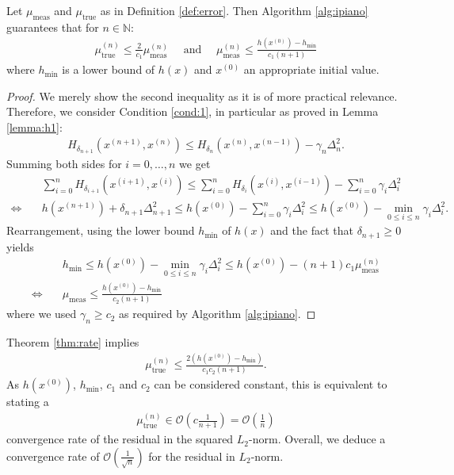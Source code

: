 \documentclass[onecolumn,final,a4paper,13pt,reqno]{siamart}
\begin{document}
\begin{theoremmd}
	Let $\mu_\text{meas}$ and $\mu_\text{true}$ as in Definition \ref{def:error}. Then Algorithm \ref{alg:ipiano} guarantees that for $n \in \mathbb{N}$:
	\begin{align}
		\mu_\text{true}^{(n)} \leq \frac{2}{c_1} \mu_\text{meas}^{(n)}\quad\text{ and }\quad \mu_\text{meas}^{(n)} \leq \frac{h(x^{(0)}) - h_{\min}}{c_1(n + 1)}
	\end{align}
	where $h_{\min}$ is a lower bound of $h(x)$ and $x^{(0)}$ an appropriate initial value.\label{thm:rate}
\end{theoremmd}

\begin{proof}
	We merely show the second inequality as it is of more practical relevance. Therefore, we consider Condition \ref{cond:1}, in particular as proved in Lemma \ref{lemma:h1}:
	\begin{align}
		H_{\delta_{n + 1}}(x^{(n + 1)}, x^{(n)}) \leq H_{\delta_n}(x^{(n)}, x^{(n -1)}) - \gamma_n \Delta_n^2.
	\end{align}
	Summing both sides for $i = 0, \ldots, n$ we get
	\begin{align}
		&\sum_{i = 0}^n H_{\delta_{i + 1}}(x^{(i + 1)}, x^{(i)}) \leq \sum_{i = 0}^n H_{\delta_i}(x^{(i)}, x^{(i - 1)}) - \sum_{i = 0}^n \gamma_i \Delta_i^2\\
		\Leftrightarrow\quad& h(x^{(n + 1)}) + \delta_{n + 1} \Delta_{n + 1}^2 \leq h(x^{(0)}) - \sum_{i = 0}^n \gamma_i \Delta_i^2 \leq h(x^{(0)}) - \min_{0 \leq i \leq n} \gamma_i \Delta_i^2.
	\end{align}
	Rearrangement, using the lower bound $h_{\min}$ of $h(x)$ and the fact that $\delta_{n + 1} \geq 0$ yields
	\begin{align}
		&h_{\min} \leq h(x^{(0)}) - \min_{0 \leq i \leq n} \gamma_i \Delta_i^2 \leq h(x^{(0)}) - (n + 1) c_1 \mu_\text{meas}^{(n)}\\
		\Leftrightarrow\quad& \mu_\text{meas} \leq \frac{h(x^{(0)}) - h_{\min}}{c_2(n + 1)}
	\end{align}
	where we used $\gamma_n \geq c_2$ as required by Algorithm \ref{alg:ipiano}.
\end{proof}

Theorem \ref{thm:rate} implies
\begin{align}
	\mu_\text{true}^{(n)} \leq \frac{2(h(x^{(0)}) - h_{\min})}{c_1 c_2 (n + 1)}.
\end{align}
As $h(x^{(0)})$, $h_{\min}$, $c_1$ and $c_2$ can be considered constant, this is equivalent to stating a
\begin{align}
	\mu_\text{true}^{(n)} \in \mathcal{O}(c \frac{1}{n + 1}) = \mathcal{O}(\frac{1}{n})
\end{align}
convergence rate of the residual in the squared $L_2$-norm. Overall, we deduce a convergence rate of $\mathcal{O}(\frac{1}{\sqrt{n}})$ for the residual in $L_2$-norm.
\end{document}
